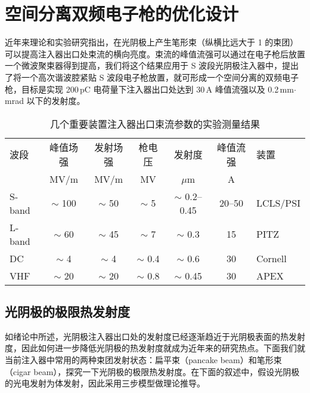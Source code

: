 \chapter{空间分离双频电子枪的优化设计}
\label{chap:GA}
近年来理论和实验研究指出\cite{Qian:2016aa,Bettoni:2016aa}，在光阴极上产生笔形束（纵横比远大于 1 的束团）可以提高注入器出口处束流的横向亮度。束流的峰值流强可以通过在电子枪后放置一个微波聚束器得到提高，我们将这个结果应用于 S 波段光阴极注入器中，提出了将一个高次谐波腔紧贴 S 波段电子枪放置，就可形成一个空间分离的双频电子枪，目标是实现 200\,pC 电荷量下注入器出口处达到 30\,A 峰值流强以及 0.2\,mm$\cdot$mrad 以下的发射度。

\begin{table}[htbp]
\caption{几个重要装置注入器出口束流参数的实验测量结果}
\centering
\begin{tabular}{lcccccl}
\toprule
波段 & 峰值场强 & 发射场强 & 枪电压 & 发射度 & 峰值流强 & 装置 \\
 & MV/m & MV/m & MV & $\mu$m & A & \\
\midrule
S-band & $\sim$ 100 & $\sim$ 50 & $\sim$ 5 & $\sim$ 0.2--0.45 & 20--50 & LCLS/PSI \\
L-band & $\sim$ 60 & $\sim$ 45 & $\sim$ 7 & $\sim$ 0.3 & 15 & PITZ \\
DC & $\sim$ 4 & $\sim$ 4 & $\sim$ 0.4 & $\sim$ 0.6 & 30 & Cornell \\
VHF & $\sim$ 20 & $\sim$ 20 & $\sim$ 0.8 & $\sim$ 0.45 & 30 & APEX \\
\bottomrule
\end{tabular}
\end{table}

\section{光阴极的极限热发射度}
如绪论中所述，光阴极注入器出口处的发射度已经逐渐趋近于光阴极表面的热发射度，因此如何进一步降低光阴极的热发射度就成为近年来的研究热点。下面我们就当前注入器中常用的两种束团发射状态：扁平束（pancake beam）和笔形束（cigar beam），探究一下光阴极的极限热发射度。在下面的叙述中，假设光阴极的光电发射为体发射，因此采用三步模型做理论推导。

